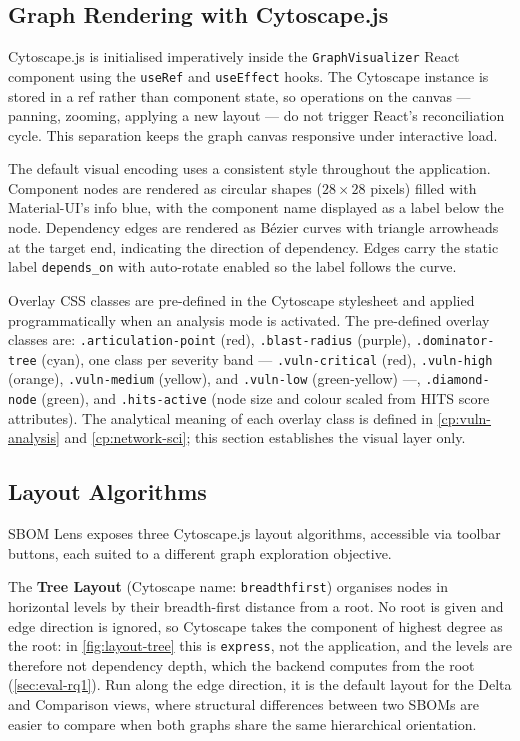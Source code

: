 \subsection{Graph Rendering with Cytoscape.js}
\label{sec:cytoscape-rendering}

Cytoscape.js is initialised imperatively inside the \texttt{GraphVisualizer} React component using the \texttt{useRef} and \texttt{useEffect} hooks. The Cytoscape instance is stored in a ref rather than component state, so operations on the canvas --- panning, zooming, applying a new layout --- do not trigger React's reconciliation cycle. This separation keeps the graph canvas responsive under interactive load.

The default visual encoding uses a consistent style throughout the application. Component nodes are rendered as circular shapes (\(28 \times 28\) pixels) filled with Material-UI's info blue, with the component name displayed as a label below the node. Dependency edges are rendered as Bézier curves with triangle arrowheads at the target end, indicating the direction of dependency. Edges carry the static label \texttt{depends\_on} with auto-rotate enabled so the label follows the curve.

Overlay CSS classes are pre-defined in the Cytoscape stylesheet and applied programmatically when an analysis mode is activated. The pre-defined overlay classes are: \texttt{.articulation-point} (red), \texttt{.blast-radius} (purple), \texttt{.dominator-tree} (cyan), one class per severity band --- \texttt{.vuln-critical} (red), \texttt{.vuln-high} (orange), \texttt{.vuln-medium} (yellow), and \texttt{.vuln-low} (green-yellow) ---, \texttt{.diamond-node} (green), and \texttt{.hits-active} (node size and colour scaled from HITS score attributes). The analytical meaning of each overlay class is defined in \autoref{cp:vuln-analysis} and \autoref{cp:network-sci}; this section establishes the visual layer only.


\subsection{Layout Algorithms}
\label{sec:layouts}

SBOM Lens exposes three Cytoscape.js layout algorithms, accessible via toolbar buttons, each suited to a different graph exploration objective.

The \textbf{Tree Layout} (Cytoscape name: \texttt{breadthfirst}) organises nodes in horizontal levels by their breadth-first distance from a root. No root is given and edge direction is ignored, so Cytoscape takes the component of highest degree as the root: in \autoref{fig:layout-tree} this is \texttt{express}, not the application, and the levels are therefore not dependency depth, which the backend computes from the root (\autoref{sec:eval-rq1}). Run along the edge direction, it is the default layout for the Delta and Comparison views, where structural differences between two SBOMs are easier to compare when both graphs share the same hierarchical orientation.

